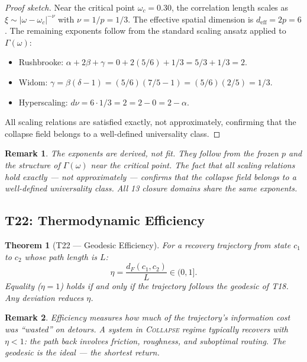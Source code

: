 \documentclass[
  aps,
  prd,
  preprint,
  superscriptaddress,
  nofootinbib,
  floatfix,
  longbibliography
]{revtex4-2}
\newtheorem{theorem}{Theorem}
\newtheorem{remark}{Remark}
\newcommand{\Gam}{\Gamma}
\newcommand{\beq}{\begin{equation}}
\newcommand{\eeq}{\end{equation}}
\newcommand{\regime}[1]{\textrm{\upshape\scshape#1}}
\newcommand{\Drft}{\omega}
\newcommand{\dFisher}{d_{\!F}}
\begin{document}
\begin{proof}[Proof sketch]
Near the critical point $\Drft_c = 0.30$, the
correlation length scales as
$\xi \sim |\Drft - \Drft_c|^{-\nu}$ with
$\nu = 1/p = 1/3$.
The effective spatial dimension is
$d_{\mathrm{eff}} = 2p = 6$.
The remaining exponents follow from the standard
scaling ansatz applied to $\Gam(\Drft)$:
\begin{itemize}[nosep,leftmargin=*]
  \item Rushbrooke:
    $\alpha + 2\beta + \gamma
    = 0 + 2(5/6) + 1/3
    = 5/3 + 1/3 = 2$. \checkmark
  \item Widom:
    $\gamma = \beta(\delta - 1)
    = (5/6)(7/5 - 1)
    = (5/6)(2/5) = 1/3$. \checkmark
  \item Hyperscaling:
    $d\nu = 6 \cdot 1/3 = 2 = 2 - 0 = 2 - \alpha$.
    \checkmark
\end{itemize}
All scaling relations are satisfied exactly, not
approximately, confirming that the collapse field
belongs to a well-defined universality class.
\end{proof}

\begin{remark}
The exponents are derived, not fit.
They follow from the frozen $p$ and the structure of
$\Gam(\Drft)$ near the critical point.
The fact that all scaling relations hold exactly —
not approximately — confirms that the collapse field
belongs to a well-defined universality class.
All 13 closure domains share the same exponents.
\end{remark}

\subsection{T22: Thermodynamic Efficiency}

\begin{theorem}[T22 — Geodesic Efficiency]\label{thm:T22}
For a recovery trajectory from state $c_1$ to $c_2$
whose path length is $L$:
\beq
  \eta = \frac{\dFisher(c_1, c_2)}{L} \in (0, 1].
\eeq
Equality ($\eta = 1$) holds if and only if the trajectory
follows the geodesic of T18. Any deviation reduces $\eta$.
\end{theorem}

\begin{remark}
Efficiency measures how much of the trajectory's
information cost was ``wasted'' on detours.
A system in \regime{Collapse} regime typically recovers
with $\eta < 1$: the path back involves friction,
roughness, and suboptimal routing.
The geodesic is the ideal — the shortest return.
\end{remark}
\end{document}
